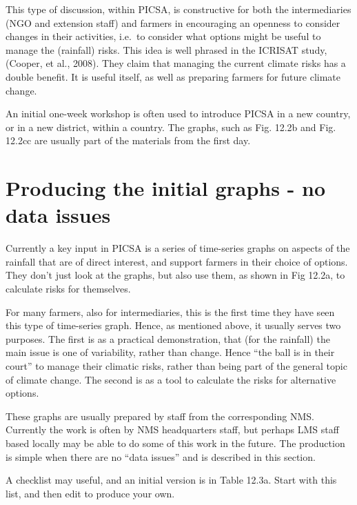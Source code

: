 \documentclass[
  letterpaper,
  DIV=11,
  numbers=noendperiod]{scrreprt}
\begin{document}
This type of discussion, within PICSA, is constructive for both the
intermediaries (NGO and extension staff) and farmers in encouraging an
openness to consider changes in their activities, i.e.~to consider what
options might be useful to manage the (rainfall) risks. This idea is
well phrased in the ICRISAT study, (Cooper, et al., 2008). They claim
that managing the current climate risks has a double benefit. It is
useful itself, as well as preparing farmers for future climate change.

An initial one-week workshop is often used to introduce PICSA in a new
country, or in a new district, within a country. The graphs, such as
Fig. 12.2b and Fig. 12.2cc are usually part of the materials from the
first day.

\section{Producing the initial graphs - no data
issues}\label{producing-the-initial-graphs---no-data-issues}

Currently a key input in PICSA is a series of time-series graphs on
aspects of the rainfall that are of direct interest, and support farmers
in their choice of options. They don't just look at the graphs, but also
use them, as shown in Fig 12.2a, to calculate risks for themselves.

For many farmers, also for intermediaries, this is the first time they
have seen this type of time-series graph. Hence, as mentioned above, it
usually serves two purposes. The first is as a practical demonstration,
that (for the rainfall) the main issue is one of variability, rather
than change. Hence ``the ball is in their court'' to manage their
climatic risks, rather than being part of the general topic of climate
change. The second is as a tool to calculate the risks for alternative
options.

These graphs are usually prepared by staff from the corresponding NMS.
Currently the work is often by NMS headquarters staff, but perhaps LMS
staff based locally may be able to do some of this work in the future.
The production is simple when there are no ``data issues'' and is
described in this section.

A checklist may useful, and an initial version is in Table 12.3a. Start
with this list, and then edit to produce your own.
\end{document}
